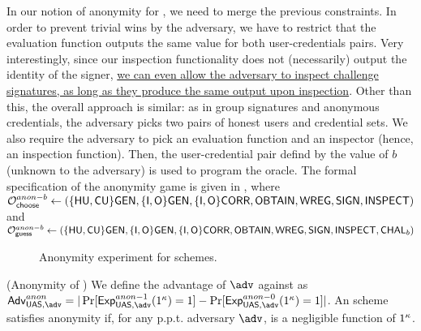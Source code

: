 In our notion of anonymity for \UAS, we need to merge the previous constraints.
In order to prevent trivial wins by the adversary, we have to restrict that the
evaluation function outputs the same value for both user-credentials pairs. Very
interestingly, since our inspection functionality does not (necessarily) output
the identity of the signer, \uline{we can even allow the adversary to
  inspect challenge signatures, as long as they produce the same output upon
  inspection}. Other than this, the overall approach is similar: as in group
signatures and anonymous credentials, the adversary picks two pairs of honest
users and credential sets. We also require the adversary to pick an evaluation
function and an inspector (hence, an inspection function). Then, the
user-credential pair defind by the value of $b$ (unknown to the adversary) is
used to program the \CHALb oracle. The formal specification of the anonymity
game is given in , where $\mathcal{O}^{anon-b}_{\mathsf{choose}} \gets (\lbrace\mathsf{HU},
\mathsf{CU}\rbrace\mathsf{GEN},\lbrace\mathsf{I},\mathsf{O}\rbrace\mathsf{GEN},\lbrace\mathsf{I},\mathsf{O}\rbrace\mathsf{CORR},\mathsf{OBTAIN},
\mathsf{WREG},\mathsf{SIGN},\mathsf{INSPECT})$ and $\mathcal{O}^{anon-b}_{\mathsf{guess}} \gets (\lbrace\mathsf{HU},\mathsf{CU}\rbrace\mathsf{GEN},\lbrace\mathsf{I},
\mathsf{O}\rbrace\mathsf{GEN},\lbrace\mathsf{I},\mathsf{O}\rbrace\mathsf{CORR},\mathsf{OBTAIN},\mathsf{WREG},\mathsf{SIGN},\mathsf{INSPECT},\mathsf{CHAL}_b)$

\begin{figure}[htp!]
  \caption{Anonymity experiment for \UAS schemes.}
  \label{fig:exp-uas-anonb}
\end{figure}

\begin{definition}{(Anonymity of \UAS)}
  We define the advantage \AdvAnon of $\adv$ against \ExpAnonb as
  $\AdvAnon=|\Pr\lbrack\ExpAnono(1^\secpar)=1\rbrack-
  \Pr\lbrack\ExpAnonz(1^\secpar)=1\rbrack|$.
  An \UAS scheme satisfies anonymity if, for any p.p.t. adversary $\adv$,
  \AdvAnon is a negligible function of $1^\kappa$.
\end{definition}

